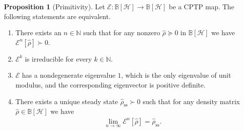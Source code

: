 \documentclass[preprint,pteplogo]{ptephy_v2}%
\numberwithin{equation}{section}
\theoremstyle{definition}
\newtheorem{proposition}[theorem]{Proposition}
\newcommand{\mc}[1]{\mathcal{#1}}
\newcommand{\mbb}[1]{\mathbb{#1}}
\begin{document}
\begin{proposition}[Primitivity]
\label{prop:primitivity}
Let $\mc{E}: \mbb{B}[\mc{H}] \to \mbb{B}[\mc{H}]$ be a CPTP map. 
The following statements are equivalent.
\begin{enumerate}
\item There exists an $n \in \mbb{N}$ such that for any nonzero $\hat{\rho} \succeq 0$ in $\mbb{B}[\mc{H}]$ we have $\mc{E}^n[\hat{\rho}] {\succ} 0$.
\item $\mc{E}^k$ is irreducible for every $k \in \mbb{N}$.
\item $\mc{E}$ has a nondegenerate eigenvalue $1$, which is the only eigenvalue of unit modulus, and the corresponding eigenvector is positive definite.
\item There exists a unique steady state $\hat{\rho}_\mathrm{ss} \succ 0$ such that for any density matrix $\hat{\rho} \in \mbb{B}[\mc{H}]$ we have
\begin{align}
\lim_{n \to \infty} \mc{E}^n[\hat{\rho}] = \hat{\rho}_\mathrm{ss}.
\end{align}
\end{enumerate}
\end{proposition}
\end{document}
